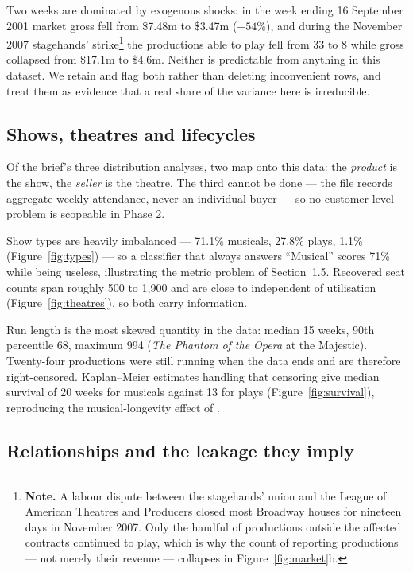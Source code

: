 Two weeks are dominated by exogenous shocks: in the week ending 16 September
2001 market gross fell from \$7.48m to \$3.47m ($-54\%$), and during the
November 2007 stagehands' strike\footnote{%
\textbf{Note.} A labour dispute between the stagehands' union and the League of
American Theatres and Producers closed most Broadway houses for nineteen days
in November 2007. Only the handful of productions outside the affected
contracts continued to play, which is why the count of reporting productions
--- not merely their revenue --- collapses in Figure~\ref{fig:market}b.}
the productions able to play fell from 33 to 8 while gross collapsed from
\$17.1m to \$4.6m. Neither is predictable from
anything in this dataset. We retain and flag both rather than deleting
inconvenient rows, and treat them as evidence that a real share of the variance
here is irreducible.

\subsection{Shows, theatres and lifecycles}

Of the brief's three distribution analyses, two map onto this data: the
\emph{product} is the show, the \emph{seller} is the theatre. The third cannot
be done --- the file records aggregate weekly attendance, never an individual
buyer --- so no customer-level problem is scopeable in Phase 2.

Show types are heavily imbalanced --- 71.1\% musicals, 27.8\% plays, 1.1\%
 (Figure~\ref{fig:types}) --- so a classifier that always answers
``Musical'' scores 71\% while being useless, illustrating the metric problem of
Section~1.5. Recovered seat counts span roughly 500 to 1{,}900 and are close to
independent of utilisation (Figure~\ref{fig:theatres}), so both carry
information.

Run length is the most skewed quantity in the data: median 15 weeks, 90th
percentile 68, maximum 994 (\emph{The Phantom of the Opera} at the Majestic).
Twenty-four productions were still running when the data ends and are therefore
right-censored. Kaplan--Meier estimates \citep{kaplan1958nonparametric} handling
that censoring give median survival of 20 weeks for musicals against 13 for
plays (Figure~\ref{fig:survival}), reproducing the musical-longevity effect of
\citet{simonoff2016survival}.

\subsection{Relationships and the leakage they imply}

